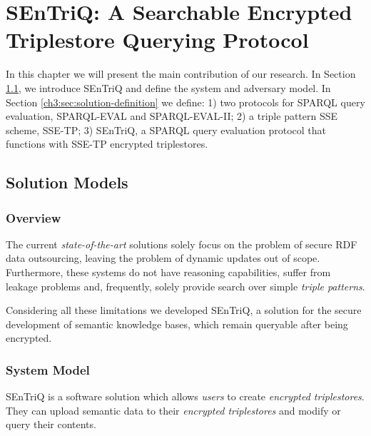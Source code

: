 
\chapter{SEnTriQ: A Searchable Encrypted Triplestore Querying Protocol}
\label{cha:solution}


In this chapter we will present the main contribution of our research. In Section \ref{ch3:sec:solution-models}, we introduce \gls{SEnTriQ} and define the system and adversary model. In Section \ref{ch3:sec:solution-definition} we define: 1) two protocols for \gls{SPARQL} query evaluation, SPARQL-EVAL and SPARQL-EVAL-II; 2) a triple pattern \gls{SSE} scheme, SSE-TP; 3) \gls{SEnTriQ}, a \gls{SPARQL} query evaluation protocol that functions with SSE-TP encrypted triplestores.



\section{Solution Models}
\label{ch3:sec:solution-models}

\subsection{Overview}

The current \emph{state-of-the-art} solutions solely focus on the problem of secure \gls{RDF} data outsourcing, leaving the problem of dynamic updates out of scope. Furthermore, these systems do not have reasoning capabilities, suffer from leakage problems and, frequently, solely provide search over simple \emph{triple patterns}.

Considering all these limitations we developed \gls{SEnTriQ}, a solution for the secure development of semantic knowledge bases, which remain queryable after being encrypted.

\subsection{System Model}
\label{ch3:sec:solution-models:system-model}

\gls{SEnTriQ} is a software solution which allows \emph{users} to create \emph{encrypted triplestores}. They can upload semantic data to their \emph{encrypted triplestores} and modify or query their contents.

